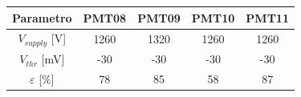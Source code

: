 \begin{tabular}{ccccc}
\toprule
Parametro & PMT08 & PMT09 & PMT10 & PMT11 \\
\midrule
$V_{supply}$ [V] & 1260  & 1320  & 1260  & 1260  \\
$V_{thr}$ [mV] & -30 & -30 & -30 & -30 \\
$\varepsilon$ [$\%$] & 78  & 85  & 58 & 87 \\
\bottomrule
\end{tabular}